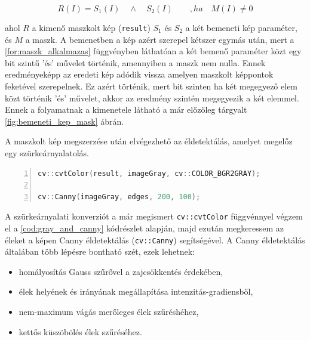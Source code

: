\begin{equation}
    R(I) = S_1(I)\quad \land\quad S_2(I)\qquad ,ha\quad M(I) \ne 0
    \label{for:maszk_alkalmazas}
\end{equation}

\par ahol $R$ a kimenő maszkolt kép (\lstinline{result}) $S_1$ és $S_2$ a két bemeneti kép paraméter, és $M$ a maszk. A bemenetben a kép azért szerepel kétszer egymás után, mert a \ref{for:maszk_alkalmazas} függvényben láthatóan a két bemenő paraméter közt egy bit szintű 'és' művelet történik, amennyiben a maszk nem nulla. Ennek eredményeképp az eredeti kép adódik vissza amelyen maszkolt képpontok feketével szerepelnek. Ez azért történik, mert bit szinten ha két megegyező elem közt történik 'és' művelet, akkor az eredmény szintén megegyezik a két elemmel. Ennek a folyamatnak a kimenetele látható a már előzőleg tárgyalt \ref{fig:bemeneti_kep_mask} ábrán.
\par A maszkolt kép megszerzése után elvégezhető az éldetektálás, amelyet megelőz egy szürkeárnyalatolás.

\vspace{2mm}
\hspace{-10mm}
\begin{minipage}{\linewidth}
\begin{lstlisting}[language=C++, numbers=left, caption={Szürkeárnyalatolás és éldetektálás.}, label={cod:gray_and_canny}]
cv::cvtColor(result, imageGray, cv::COLOR_BGR2GRAY);

cv::Canny(imageGray, edges, 200, 100);
\end{lstlisting}
\end{minipage}

\par A szürkeárnyalati konverziót a már megismert \lstinline{cv::cvtColor} függvénnyel \cite{opencv_docs} végzem el a \ref{cod:gray_and_canny} kódrészlet alapján, majd ezután megkeressem az éleket a képen Canny éldetektálás \cite{opencv_docs, canny_edge_detection} (\lstinline{cv::Canny}) segítségével.
\newline A Canny éldetektálás általában több lépésre bontható szét, ezek lehetnek:

\begin{itemize}
    \setlength\itemsep{-2pt}
    \item homályosítás Gauss szűrővel \cite{shapiro2001} a zajcsökkentés érdekében,
    \item élek helyének és irányának megállapítása intenzitás-gradiensből,
    \item nem-maximum vágás merőleges élek szűréshéhez,
    \item kettős küszöbölés élek szűréséhez.
\end{itemize}

